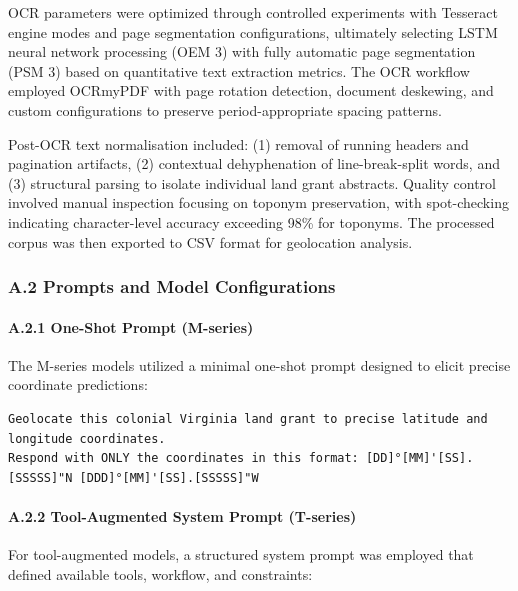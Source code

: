 \documentclass[
  10pt]{article}
\begin{document}
OCR parameters were optimized through controlled experiments with
Tesseract engine modes and page segmentation configurations, ultimately
selecting LSTM neural network processing (OEM 3) with fully automatic
page segmentation (PSM 3) based on quantitative text extraction metrics.
The OCR workflow employed OCRmyPDF with page rotation detection,
document deskewing, and custom configurations to preserve
period-appropriate spacing patterns.

Post-OCR text normalisation included: (1) removal of running headers and
pagination artifacts, (2) contextual dehyphenation of line-break-split
words, and (3) structural parsing to isolate individual land grant
abstracts. Quality control involved manual inspection focusing on
toponym preservation, with spot-checking indicating character-level
accuracy exceeding 98\% for toponyms. The processed corpus was then
exported to CSV format for geolocation analysis.

\subsubsection{A.2 Prompts and Model Configurations}\label{sec:prompts}

\paragraph{A.2.1 One-Shot Prompt
(M-series)}\label{a.2.1-one-shot-prompt-m-series}

The M-series models utilized a minimal one-shot prompt designed to
elicit precise coordinate predictions:

\begin{lstlisting}
Geolocate this colonial Virginia land grant to precise latitude and longitude coordinates.
Respond with ONLY the coordinates in this format: [DD]°[MM]'[SS].[SSSSS]"N [DDD]°[MM]'[SS].[SSSSS]"W
\end{lstlisting}

\paragraph{A.2.2 Tool-Augmented System Prompt
(T-series)}\label{a.2.2-tool-augmented-system-prompt-t-series}

For tool-augmented models, a structured system prompt was employed that
defined available tools, workflow, and constraints:
\end{document}
